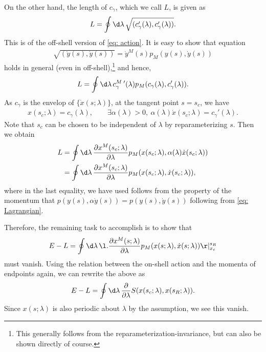 \documentclass[12pt]{article}
\begin{document}
On the other hand, the length of $c_\gamma$, which we call $L$, is given as
\begin{align}
	L = 	\oint \d \lambda\,\sqrt{(c_\gamma'(\lambda),c_\gamma'(\lambda))}.
\end{align}
This is of the off-shell version of \eqref{eq: action}.
It is easy to show that equation
\begin{align}
	\sqrt{(\dot y(s),\dot y(s))} = \dot y^M(s) p_M(y(s),\dot y(s))\label{eq: Lagrangian}
\end{align}
holds in general (even in off-shell),\footnote{
This generally follows from the reparameterization-invariance, but can also be shown directly of course.
}
and hence,
\begin{align}
	L = \oint\d\lambda\, c_\gamma^M\,'(\lambda) p_M(c_\gamma(\lambda),c_\gamma'(\lambda)). 	
\end{align}
As $c_\gamma$ is the envelop of $\{\dot x(s;\lambda)\}$, at the tangent point $s = s_c$, we have
\begin{align}
	x(s_c;\lambda) = c_\gamma(\lambda),\qquad
	\exists\alpha(\lambda) > 0,~ \alpha(\lambda)\dot x(s_c;\lambda) = c_\gamma'(\lambda).
\end{align}
Note that $s_c$ can be chosen to be independent of $\lambda$ by reparameterizing $s$.
Then we obtain
\begin{align}
	L &= \oint\d\lambda\,\frac{\partial x^M(s_c;\lambda)}{\partial \lambda}p_M(x(s_c;\lambda),\alpha(\lambda)\dot x(s_c;\lambda))\nonumber\\
	&=
	\oint\d\lambda\,\frac{\partial x^M(s_c;\lambda)}{\partial \lambda}p_M(x(s_c;\lambda),\dot x(s_c;\lambda)),
\end{align}
where in the last equality, we have used follows from the property of the momentum that $p(y(s),\alpha \dot y(s)) = p(y(s),\dot y(s))$ following from \eqref{eq: Lagrangian}.

Therefore, the remaining task to accomplish is to show that
\begin{align}
	 E - L = \oint\d\lambda\,\l.\frac{\partial x^M(s;\lambda)}{\partial \lambda}p_M(x(s;\lambda),\dot x(s;\lambda))\r|^{s_R}_{x_c}
\end{align}
must vanish.
Using the relation between the on-shell action and the momenta of endpoints again, we can rewrite the above as
\begin{align}
	E - L = \oint\d\lambda\,\frac{\partial}{\partial \lambda}S(x(s_c;\lambda),x(s_R;\lambda)).
\end{align}
Since $x(s;\lambda)$ is also periodic about $\lambda$ by the assumption, we see this vanish.




















 

\end{document}
